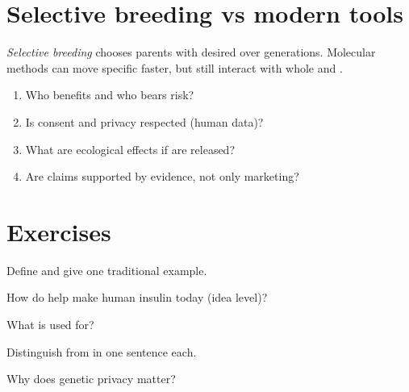\section{Selective breeding vs modern tools}

\begin{proposition}\label{prop:g9:biotech:breed}
\emph{Selective breeding} chooses parents with
desired  over generations. Molecular methods can move specific 
faster, but still interact with whole  and .
\end{proposition}
\admitted

\begin{method}\label{met:g9:biotech:ethics}
\begin{enumerate}
  \item Who benefits and who bears risk?
  \item Is consent and privacy respected (human data)?
  \item What are ecological effects if  are released?
  \item Are claims supported by evidence, not only marketing?
\end{enumerate}
\end{method}

\section{Exercises}

\begin{exercise}[$\star$]\label{exo:g9:biotech:1}
Define  and give one traditional example.
\end{exercise}

\begin{exercise}[$\star$]\label{exo:g9:biotech:2}
How do  help make human insulin today (idea level)?
\end{exercise}

\begin{exercise}[$\star$]\label{exo:g9:biotech:3}
What is  used for?
\end{exercise}

\begin{exercise}[$\star$]\label{exo:g9:biotech:4}
Distinguish  from  in one sentence
each.
\end{exercise}

\begin{exercise}[$\star$]\label{exo:g9:biotech:5}
Why does genetic privacy matter?
\end{exercise}

